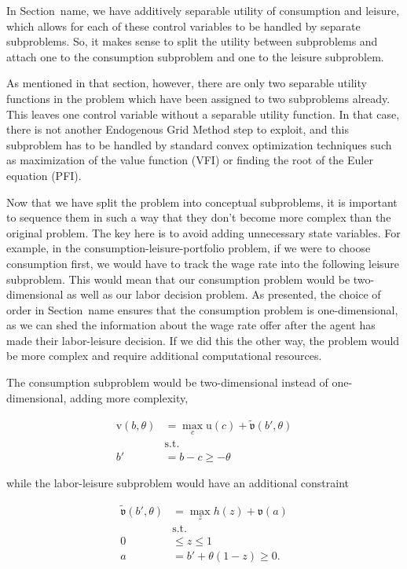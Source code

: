 \documentclass{article}
\newcommand{\aRat}{a}
\newcommand{\cRat}{c}
\newcommand{\uFunc}{\mathrm{u}}
\newcommand{\vFunc}{\mathrm{v}}
\newcommand{\tShkEmp}{\theta}
\newcommand{\bRat}{b}
\newcommand{\vOpt}{\tilde{\mathfrak{v}}}
\newcommand{\vEnd}{\mathfrak{v}}
\newcommand{\leisure}{z}
\newcommand{\h}{h}
\begin{document}
In Section~{name}, we have additively separable utility of consumption and leisure, which allows for each of these control variables to be handled by separate subproblems. So, it makes sense to split the utility between subproblems and attach one to the consumption subproblem and one to the leisure subproblem.

As mentioned in that section, however, there are only two separable utility functions in the problem which have been assigned to two subproblems already. This leaves one control variable without a separable utility function. In that case, there is not another Endogenous Grid Method step to exploit, and this subproblem has to be handled by standard convex optimization techniques such as maximization of the value function (VFI) or finding the root of the Euler equation (PFI).

Now that we have split the problem into conceptual subproblems, it is important to sequence them in such a way that they don't become more complex than the original problem. The key here is to avoid adding unnecessary state variables. For example, in the consumption-leisure-portfolio problem, if we were to choose consumption first, we would have to track the wage rate into the following leisure subproblem. This would mean that our consumption problem would be two-dimensional as well as our labor decision problem. As presented, the choice of order in Section~{name} ensures that the consumption problem is one-dimensional, as we can shed the information about the wage rate offer after the agent has made their labor-leisure decision. If we did this the other way, the problem would be more complex and require additional computational resources.

The consumption subproblem would be two-dimensional instead of one-dimensional, adding more complexity,

\begin{equation}
\begin{split}
        \vFunc(\bRat, \tShkEmp) & = \max_{\cRat} \uFunc(\cRat) + \vOpt(\bRat', \tShkEmp) \\
        & \text{s.t.}\\
        \bRat' & = \bRat - \cRat \ge - \tShkEmp
    \end{split}
\end{equation}

while the labor-leisure subproblem would have an additional constraint

\begin{equation}
\begin{split}
        \vOpt(\bRat', \tShkEmp) & = \max_{\leisure} \h(\leisure) + \vEnd(\aRat) \\
        & \text{s.t.} \\
        0 & \le \leisure \le 1 \\
        \aRat & = \bRat' + \tShkEmp(1 - \leisure) \ge 0.
    \end{split}
\end{equation}
\end{document}
